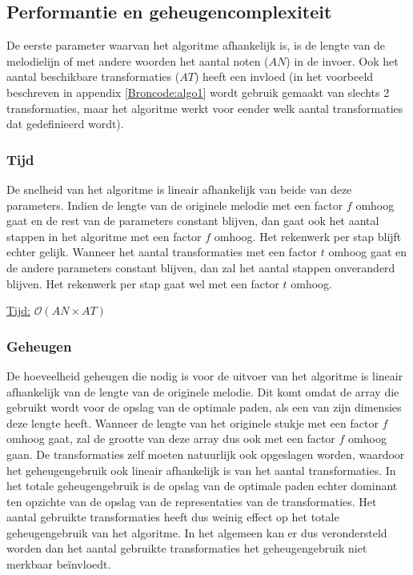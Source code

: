 \subsection{Performantie en geheugencomplexiteit}
De eerste parameter waarvan het algoritme afhankelijk is, is de lengte van de melodielijn of met andere woorden het aantal noten ($AN$) in de invoer. Ook het aantal beschikbare transformaties ($AT$) heeft een invloed (in het voorbeeld beschreven in appendix \ref{Broncode:algo1} wordt gebruik gemaakt van slechts 2 transformaties, maar het algoritme werkt voor eender welk aantal transformaties dat gedefinieerd wordt).

\subsubsection{Tijd} 
De snelheid van het algoritme is lineair afhankelijk van beide van deze parameters. Indien de lengte van de originele melodie met een factor $f$ omhoog gaat en de rest van de parameters constant blijven, dan gaat ook het aantal stappen in het algoritme met een factor $f$ omhoog. Het rekenwerk per stap blijft echter gelijk. Wanneer het aantal transformaties met een factor $t$ omhoog gaat en de andere parameters constant blijven, dan zal het aantal stappen onveranderd blijven. Het rekenwerk per stap gaat wel met een factor $t$ omhoog.

\begin{center}
\underline{Tijd:} $\mathcal{O}(AN \times AT)$
\end{center}

\subsubsection{Geheugen}
De hoeveelheid geheugen die nodig is voor de uitvoer van het algoritme is lineair afhankelijk van de lengte van de originele melodie. Dit komt omdat de array die gebruikt wordt voor de opslag van de optimale paden, als een van zijn dimensies deze lengte heeft. Wanneer de lengte van het originele stukje met een factor $f$ omhoog gaat, zal de grootte van deze array dus ook met een factor $f$ omhoog gaan. De transformaties zelf moeten natuurlijk ook opgeslagen worden, waardoor het geheugengebruik ook lineair afhankelijk is van het aantal transformaties. In het totale geheugengebruik is de opslag van de optimale paden echter dominant ten opzichte van de opslag van de representaties van de transformaties. Het aantal gebruikte transformaties heeft dus weinig effect op het totale geheugengebruik van het algoritme. In het algemeen kan er dus verondersteld worden dan het aantal gebruikte transformaties het geheugengebruik niet merkbaar be\"invloedt.

